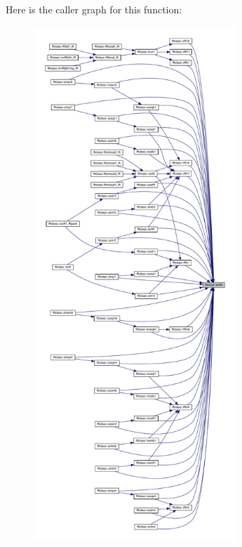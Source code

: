 Here is the caller graph for this function\+:\nopagebreak
\begin{figure}[H]
\begin{center}
\leavevmode
\includegraphics[height=550pt]{namespacefftclass_a3e1884f0fa20142f45f2d3efe3246adc_icgraph}
\end{center}
\end{figure}
